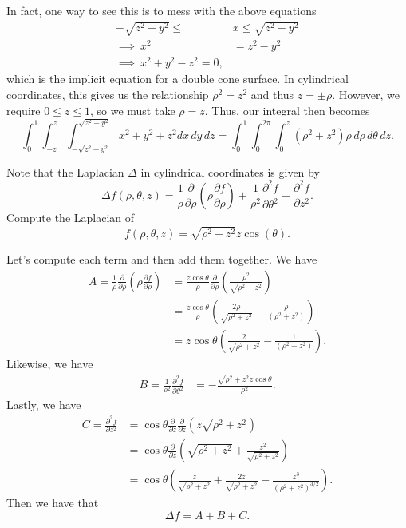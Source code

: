 \documentclass[12pt]{article} %
\begin{document}
\begin{solution}
\begin{enumerate}[(a)]
    In fact, one way to see this is to mess with the above equations
    \begin{align*}
        -\sqrt{z^2-y^2}\leq &x \leq \sqrt{z^2-y^2} \\
        \implies ~ x^2&= z^2-y^2 \\
        \implies ~ x^2+y^2-z^2=0,
    \end{align*}
    which is the implicit equation for a double cone surface. In cylindrical coordinates, this gives us the relationship $\rho^2=z^2$ and thus $z=\pm\rho$. However, we require $0\leq z \leq 1$, so we must take $\rho=z$.  Thus, our integral then becomes
    \[
    \int_0^1 \int_{-z}^z \int_{-\sqrt{z^2-y^2}}^{\sqrt{z^2-y^2}} x^2+y^2+z^2 dx\,dy\,dz = \int_{0}^1 \int_0^{2\pi} \int_{0}^z \left(\rho^2 + z^2 \right) \rho \, d\rho \, d \theta\, dz. 
    \]
    
    \end{enumerate}
\end{solution}

\newpage
\begin{problem}
    Note that the Laplacian $\Delta$ in cylindrical coordinates is given by
    \[
        \Delta f(\rho,\theta,z) = \frac{1}{\rho} \frac{\partial}{\partial \rho} \left(\rho \frac{\partial f}{\partial \rho}\right)+\frac{1}{\rho^2}\frac{\partial^2 f}{\partial \theta^2} + \frac{\partial^2 f}{\partial z^2}.
    \]
    Compute the Laplacian of
    \[
        f(\rho,\theta,z) = \sqrt{\rho^2+z^2} z \cos(\theta).
    \]
\end{problem}
\begin{solution}
Let's compute each term and then add them together. We have
\begin{align*}
    A=\frac{1}{\rho}\frac{\partial}{\partial \rho} \left(\rho \frac{\partial f}{\partial \rho} \right) &=  \frac{z\cos \theta}{\rho} \frac{\partial}{\partial \rho} \left( \frac{\rho^2}{\sqrt{\rho^2+z^2}} \right)\\
    &=\frac{z\cos \theta}{\rho} \left(\frac{2\rho}{\sqrt{\rho^2+z^2}}-\frac{\rho}{\left(\rho^2+z^2\right)}\right)\\
    &= z\cos \theta \left( \frac{2}{\sqrt{\rho^2+z^2}} - \frac{1}{\left(\rho^2+z^2\right)}\right).
\end{align*}
Likewise, we have
\begin{align*}
    B=\frac{1}{\rho^2} \frac{\partial^2 f}{\partial \theta^2} &= -\frac{\sqrt{\rho^2+z^2}z\cos\theta}{\rho^2}.
\end{align*}  
Lastly, we have
\begin{align*}
    C=\frac{\partial^2 f}{\partial z^2} &= \cos \theta \frac{\partial}{\partial z}\frac{\partial}{\partial z} \left( z \sqrt{\rho^2+z^2}\right)\\
    &= \cos \theta \frac{\partial}{\partial z} \left( \sqrt{\rho^2+z^2}+ \frac{z^2}{\sqrt{\rho^2+z^2}}\right)\\
    &= \cos \theta \left(\frac{z}{\sqrt{\rho^2+z^2}}+\frac{2z}{\sqrt{\rho^2+z^2}}-\frac{z^3}{\left(\rho^2+z^2\right)^{3/2}}\right).
\end{align*}
Then we have that
\[
\Delta f = A+B+C.
\]
\end{solution}
\end{document}
